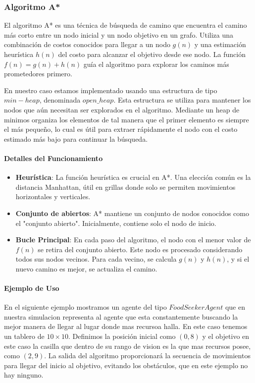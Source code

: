 \documentclass[11pt]{article}
\begin{document}
\subsubsection{Algoritmo A*}
El algoritmo A* es una técnica de búsqueda de camino que encuentra el camino más corto entre un nodo inicial y un nodo objetivo en un grafo. Utiliza una combinación de costos conocidos para llegar a un nodo \( g(n) \) y una estimación heurística \( h(n) \) del costo para alcanzar el objetivo desde ese nodo. La función \( f(n) = g(n) + h(n) \) guía el algoritmo para explorar los caminos más prometedores primero.

En nuestro caso estamos implementado usando una estructura de tipo $min-heap$, denominada $open\_heap$. Esta estructura se utiliza para mantener los nodos que aún necesitan ser explorados en el algoritmo. Mediante un heap de minimos organiza los elementos de tal manera que el primer elemento es siempre el más pequeño, lo cual es útil para extraer rápidamente el nodo con el costo estimado más bajo para continuar la búsqueda.


\paragraph{Detalles del Funcionamiento}
\begin{itemize}
    \item \textbf{Heurística}: La función heurística es crucial en A*. Una elección común es la distancia Manhattan, útil en grillas donde solo se permiten movimientos horizontales y verticales.
    \item \textbf{Conjunto de abiertos}: A* mantiene un conjunto de nodos conocidos como el "conjunto abierto". Inicialmente, contiene solo el nodo de inicio.
    \item \textbf{Bucle Principal}: En cada paso del algoritmo, el nodo con el menor valor de \( f(n) \) se retira del conjunto abierto. Este nodo es procesado considerando todos sus nodos vecinos. Para cada vecino, se calcula \( g(n) \) y \( h(n) \), y si el nuevo camino es mejor, se actualiza el camino.
\end{itemize}

\paragraph{Ejemplo de Uso}
En el siguiente ejemplo mostramos un agente del tipo $FoodSeekerAgent$ que en nuestra simulacion representa al agente que esta constantemente buscando la mejor manera de llegar al lugar donde mas recursoa halla. En este caso tenemos un tablero de \(10 \times 10\). Definimos la posición inicial como \( (0, 8) \) y el objetivo en este caso la casilla que dentro de su rango de vision
es la que mas recursos posee, como \( (2, 9) \). La salida del algoritmo proporcionará la secuencia de movimientos para llegar del inicio al objetivo, evitando los obstáculos, que en este ejemplo no hay ninguno.
\end{document}

